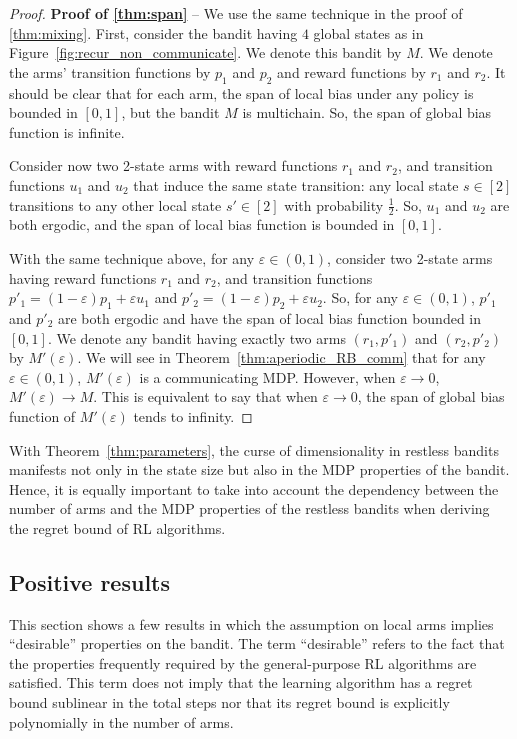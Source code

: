 \begin{proof}
    \textbf{Proof of \ref{thm:span}} -- We use the same technique in the proof of \ref{thm:mixing}.
    First, consider the bandit having $4$ global states as in Figure~\ref{fig:recur_non_communicate}.
    We denote this bandit by $M$.
    We denote the arms' transition functions by $p_1$ and $p_2$ and reward functions by $r_1$ and $r_2$.
    It should be clear that for each arm, the span of local bias under any policy is bounded in $[0,1]$, but the bandit $M$ is multichain.
    So, the span of global bias function is infinite.

    Consider now two 2-state arms with reward functions $r_1$ and $r_2$, and transition functions $u_1$ and $u_2$ that induce the same state transition: any local state $s\in[2]$ transitions to any other local state $s'\in[2]$ with probability $\frac12$.
    So, $u_1$ and $u_2$ are both ergodic, and the span of local bias function is bounded in $[0,1]$.

    With the same technique above, for any $\varepsilon\in(0,1)$, consider two 2-state arms having reward functions $r_1$ and $r_2$, and transition functions $p'_1=(1-\varepsilon)p_1+\varepsilon u_1$ and $p'_2=(1-\varepsilon)p_2+\varepsilon u_2$.
    So, for any $\varepsilon\in(0,1)$, $p'_1$ and $p'_2$ are both ergodic and have the span of local bias function bounded in $[0,1]$.
    We denote any bandit having exactly two arms $(r_1,p'_1)$ and $(r_2,p'_2)$ by $M'(\varepsilon)$.
    We will see in Theorem~\ref{thm:aperiodic_RB_comm} that for any $\varepsilon\in(0,1)$, $M'(\varepsilon)$ is a communicating MDP.
    However, when $\varepsilon\to0$, $M'(\varepsilon)\to M$.
    This is equivalent to say that when $\varepsilon\to0$, the span of global bias function of $M'(\varepsilon)$ tends to infinity.
\end{proof}

With Theorem~\ref{thm:parameters}, the curse of dimensionality in restless bandits manifests not only in the state size but also in the MDP properties of the bandit.
Hence, it is equally important to take into account the dependency between the number of arms and the MDP properties of the restless bandits when deriving the regret bound of RL algorithms.

\subsection{Positive results}

This section shows a few results in which the assumption on local arms implies ``desirable'' properties on the bandit.
The term ``desirable'' refers to the fact that the properties frequently required by the general-purpose RL algorithms are satisfied.
This term does not imply that the learning algorithm has a regret bound sublinear in the total steps nor that its regret bound is explicitly polynomially in the number of arms.

